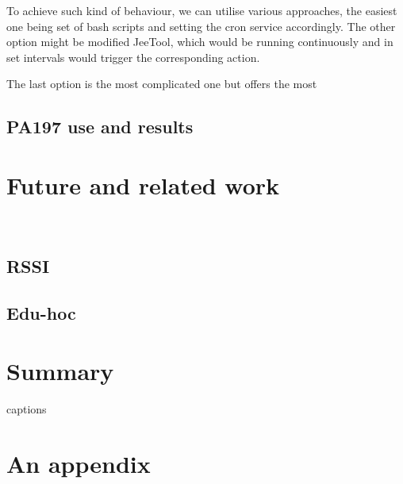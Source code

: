 \documentclass[
  print, %
  table,   %
  nolof,     %
  nolot,     %
           oneside
]{fithesis3}
\begin{document}
  To achieve such kind of behaviour, we can utilise various approaches, the easiest one being set of bash scripts and setting the cron service %
  accordingly. The other option might be modified JeeTool, which would be running continuously and in set intervals would trigger the corresponding action.

  The last option is the most complicated one but offers the most

  \section{PA197 use and results} \label{sec:PA197}

\chapter{Future and related work}\
  \section{RSSI}
  \section{Edu-hoc}
\chapter{Summary}




{\csname captions\languagename\endcsname %
\makeatletter %
  \thesis@selectLocale{\thesis@locale}\makeatother
\printbibliography[heading=bibintoc]} %

\appendix %
\chapter{An appendix}
\end{document}
